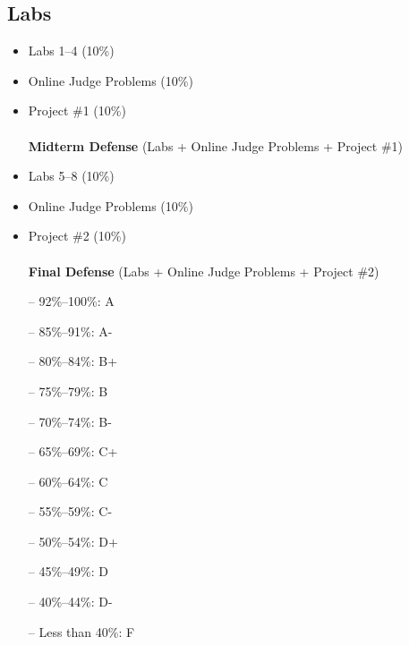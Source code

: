 \documentclass[12pt,a4paper,oneside]{article}
\begin{document}
        \subsection{Labs}

            \begin{itemize}
                \item Labs 1--4 (10\%)
                \item Online Judge Problems (10\%)
                \item Project \#1 (10\%)\\\\
                    \textbf{Midterm Defense} (Labs + Online Judge Problems + Project \#1)\\
                \item Labs 5--8 (10\%)
                \item Online Judge Problems (10\%)
                \item Project \#2 (10\%)\\\\
                    \textbf{Final Defense} (Labs + Online Judge Problems + Project \#2)\\
            \end{itemize}

        \begin{itemize} \itemsep-10pt \parskip0pt 
            \item[--] 92\%--100\%: A\\
            \item[--] 85\%--91\%: A-\\
            \item[--] 80\%--84\%: B+\\
            \item[--] 75\%--79\%: B\\
            \item[--] 70\%--74\%: B-\\
            \item[--] 65\%--69\%: C+\\
            \item[--] 60\%--64\%: C\\
            \item[--] 55\%--59\%: C-\\
            \item[--] 50\%--54\%: D+\\
            \item[--] 45\%--49\%: D\\
            \item[--] 40\%--44\%: D-\\
            \item[--] Less than 40\%: F
        \end{itemize}
\end{document}
